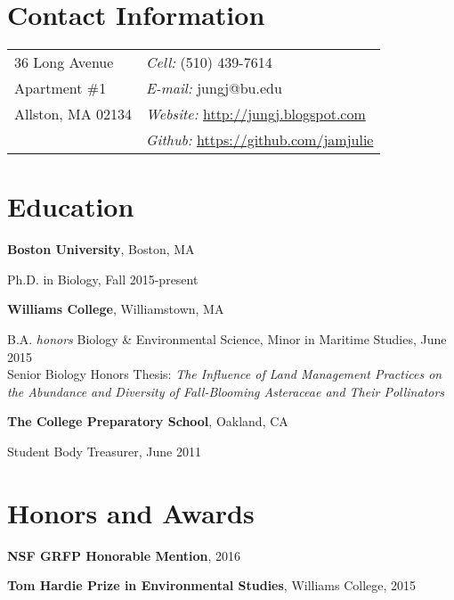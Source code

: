 \documentclass[margin,line]{res}
\begin{document}

\begin{resume}
\section{\sc Contact Information}
\vspace{.05in}
\begin{tabular}{@{}p{2in}p{4in}}
36 Long Avenue & {\it Cell:}  (510) 439-7614 \\  
Apartment \#1 & {\it E-mail:}  {\ttfamily jungj@bu.edu} \\

Allston, MA 02134 & {\it Website:} \href{http://jungj.blogspot.com}{\ttfamily http://jungj.blogspot.com}\\       
& {\it Github:} \href{https://github.com/jamjulie}{\ttfamily https://github.com/jamjulie}\\     

\end{tabular}

\section{\sc Education}
{\bf Boston University}, Boston, MA

\vspace*{-4mm}
Ph.D. in Biology, Fall 2015-present

{\bf Williams College}, Williamstown, MA

\vspace*{-4mm}
B.A.  {\it honors} Biology \& Environmental Science, Minor in Maritime Studies, June 2015 \\
Senior Biology Honors Thesis: {\it The Influence of Land Management Practices on the Abundance and Diversity of Fall-Blooming Asteraceae and Their Pollinators} 


{\bf The College Preparatory School}, Oakland, CA

\vspace*{-4mm}
Student Body Treasurer, June 2011

\section{\sc Honors and Awards} 

{\bf NSF GRFP Honorable Mention}, 2016

\vspace*{-3.5mm}
{\bf Tom Hardie Prize in Environmental Studies}, Williams College, 2015


\end{resume}
\end{document}
